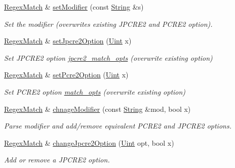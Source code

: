 \begin{DoxyCompactItemize}
\hyperlink{classjpcre2_1_1RegexMatch}{Regex\+Match} \& \hyperlink{classjpcre2_1_1RegexMatch_a9df7e92f96b61553f62720cb8f5f23e5}{set\+Modifier} (const \hyperlink{namespacejpcre2_a91f03070152fb228bc116c5a737f1d16}{String} \&s)
\begin{DoxyCompactList}\small\item\em Set the modifier (overwrites existing J\+P\+C\+R\+E2 and P\+C\+R\+E2 option). \end{DoxyCompactList}\item 
\hyperlink{classjpcre2_1_1RegexMatch}{Regex\+Match} \& \hyperlink{classjpcre2_1_1RegexMatch_a0d76033d9c134caa9ddfc21849603920}{set\+Jpcre2\+Option} (\hyperlink{namespacejpcre2_a078242d38221a13fb3543b9edd78c099}{Uint} x)
\begin{DoxyCompactList}\small\item\em Set J\+P\+C\+R\+E2 option \hyperlink{classjpcre2_1_1RegexMatch_a70d62df887eeed237724f64fbc378700}{jpcre2\+\_\+match\+\_\+opts} (overwrite existing option) \end{DoxyCompactList}\item 
\hyperlink{classjpcre2_1_1RegexMatch}{Regex\+Match} \& \hyperlink{classjpcre2_1_1RegexMatch_ae4ab558c2bec0bc9639dbca70ab47496}{set\+Pcre2\+Option} (\hyperlink{namespacejpcre2_a078242d38221a13fb3543b9edd78c099}{Uint} x)
\begin{DoxyCompactList}\small\item\em Set P\+C\+R\+E2 option \hyperlink{classjpcre2_1_1RegexMatch_a697d5731007350b0f20d2018fcfafa90}{match\+\_\+opts} (overwrite existing option) \end{DoxyCompactList}\item 
\hyperlink{classjpcre2_1_1RegexMatch}{Regex\+Match} \& \hyperlink{classjpcre2_1_1RegexMatch_a7f5283c0fd9b4514b37354a08562ff9e}{chnage\+Modifier} (const \hyperlink{namespacejpcre2_a91f03070152fb228bc116c5a737f1d16}{String} \&mod, bool x)
\begin{DoxyCompactList}\small\item\em Parse modifier and add/remove equivalent P\+C\+R\+E2 and J\+P\+C\+R\+E2 options. \end{DoxyCompactList}\item 
\hyperlink{classjpcre2_1_1RegexMatch}{Regex\+Match} \& \hyperlink{classjpcre2_1_1RegexMatch_a154430c66b8794d6632be6211a3ce870}{change\+Jpcre2\+Option} (\hyperlink{namespacejpcre2_a078242d38221a13fb3543b9edd78c099}{Uint} opt, bool x)
\begin{DoxyCompactList}\small\item\em Add or remove a J\+P\+C\+R\+E2 option. \end{DoxyCompactList}\item 

\end{DoxyCompactItemize}
